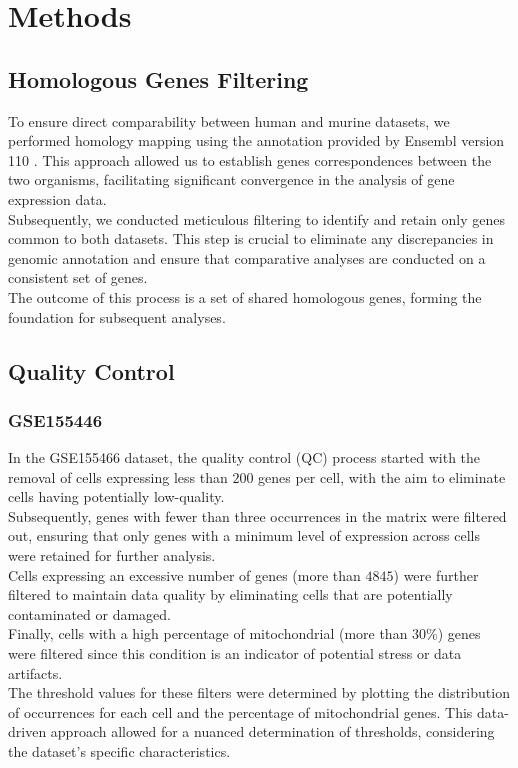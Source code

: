 \documentclass[10pt]{SelfArx} %
\begin{document}
\section{Methods}

\subsection{Homologous Genes Filtering} \label{sec:homologus_genes_method}
To ensure direct comparability between human and murine datasets, we performed homology mapping using the annotation provided by Ensembl version 110 \cite{biomart_ensembl110}. This approach allowed us to establish genes correspondences between the two organisms, facilitating significant convergence in the analysis of gene expression data. \\
Subsequently, we conducted meticulous filtering to identify and retain only genes common to both datasets. This step is crucial to eliminate any discrepancies in genomic annotation and ensure that comparative analyses are conducted on a consistent set of genes. \\
The outcome of this process is a set of shared homologous genes, forming the foundation for subsequent analyses. \\

\subsection{Quality Control}\label{sec:qc_methods}
\subsubsection*{GSE155446}
In the GSE155466 dataset, the quality control (QC) process started with the removal of cells expressing less than $200$ genes per cell, with the aim to eliminate cells having potentially low-quality. \\
Subsequently, genes with fewer than three occurrences in the matrix were filtered out, ensuring that only genes with a minimum level of expression across cells were retained for further analysis. \\
Cells expressing an excessive number of genes (more than $4845$) were further filtered to maintain data quality by eliminating cells that are potentially contaminated or damaged. \\
Finally, cells with a high percentage of mitochondrial (more than $30\%$) genes were filtered since this condition is an indicator of potential stress or data artifacts. \\
The threshold values for these filters were determined by plotting the distribution of occurrences for each cell and the percentage of mitochondrial genes. This data-driven approach allowed for a nuanced determination of thresholds, considering the dataset's specific characteristics. \\
\end{document}
